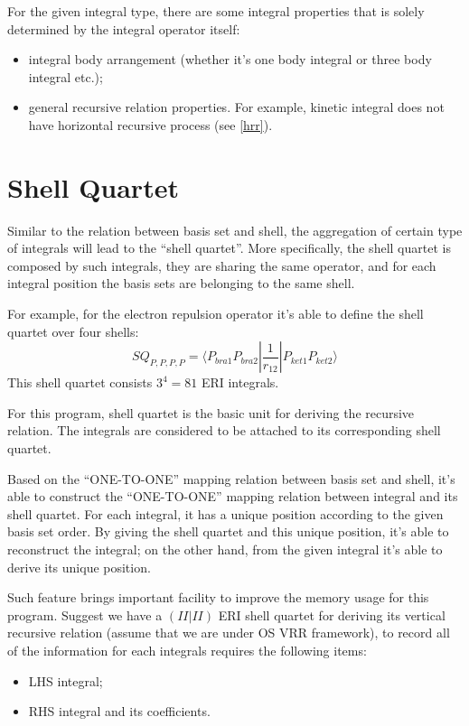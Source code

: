 For the given integral type, there are some integral properties that 
is solely determined by the integral operator itself:
\begin{itemize}
 \item integral body arrangement (whether it's one body integral or 
 three body integral etc.);
 \item general recursive relation properties. For example, kinetic
	 integral does not have horizontal recursive process (see \ref{hrr}).
\end{itemize}

\section{Shell Quartet}
%
%
\label{shell_quartet}
Similar to the relation between basis set and shell, the aggregation 
of certain type of integrals will lead to the ``shell quartet''.
More specifically, the shell quartet is composed by such integrals,
they are sharing the same operator, and for each integral position
the basis sets are belonging to the same shell.

For example, for the electron repulsion operator it's able to define 
the shell quartet over four shells:
\begin{equation}
 SQ_{P,P,P,P} = \langle P_{bra1}P_{bra2}|
 \frac{1}{r_{12}}|P_{ket1}P_{ket2} \rangle
\end{equation}
This shell quartet consists $3^{4} = 81$ ERI integrals.

For this program, shell quartet is the basic unit for deriving the 
recursive relation. The integrals are considered to be attached to 
its corresponding shell quartet.

Based on the ``ONE-TO-ONE'' mapping relation between basis set 
and shell, it's able to construct the ``ONE-TO-ONE'' mapping relation
between integral and its shell quartet. For each integral, it 
has a unique position according to the given basis set order. 
By giving the shell quartet and this unique position, it's able 
to reconstruct the integral; on the other hand, from the given 
integral it's able to derive its unique position.

Such feature brings important facility to improve the memory 
usage for this program. Suggest we have a $(II|II)$ ERI shell 
quartet for deriving its vertical recursive relation (assume
that we are under OS VRR framework), to record
all of the information for each integrals requires the following 
items:
\begin{itemize}
 \item LHS integral;
 \item RHS integral and its coefficients.
\end{itemize}

